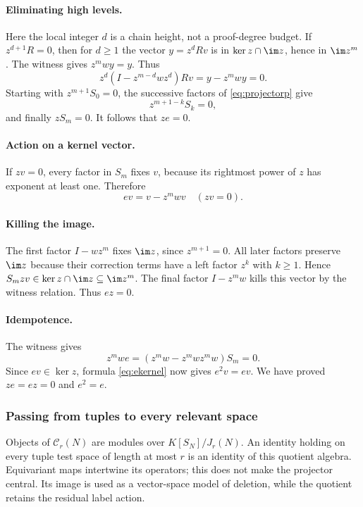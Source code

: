 \paragraph{Eliminating high levels.}
Here the local integer $d$ is a chain height, not a proof-degree budget.
If $z^{d+1}R=0$, then for $d\ge1$ the vector $y=z^dRv$ is in $\ker z\cap\im z$, hence in $\im z^m$. The witness gives $z^mwy=y$. Thus
\[z^d(I-z^{m-d}wz^d)Rv=y-z^mwy=0.
\]
Starting with $z^{m+1}S_0=0$, the successive factors of \eqref{eq:projectorp} give
\[z^{m+1-k}S_k=0,
\]
and finally $zS_m=0$. It follows that $ze=0$.

\paragraph{Action on a kernel vector.}
If $zv=0$, every factor in $S_m$ fixes $v$, because its rightmost power of $z$ has exponent at least one. Therefore
\begin{equation}\label{eq:ekernel}ev=v-z^mwv\quad(zv=0).
\end{equation}

\paragraph{Killing the image.}
The first factor $I-wz^m$ fixes $\im z$, since $z^{m+1}=0$. All later factors preserve $\im z$ because their correction terms have a left factor $z^k$ with $k\ge1$. Hence $S_mzv\in\ker z\cap\im z\subseteq\im z^m$. The final factor $I-z^mw$ kills this vector by the witness relation. Thus $ez=0$.

\paragraph{Idempotence.}
The witness gives
\[z^mwe=(z^mw-z^mwz^mw)S_m=0.
\]
Since $ev\in\ker z$, formula \eqref{eq:ekernel} now gives $e^2v=ev$. We have proved $ze=ez=0$ and $e^2=e$.

\subsubsection{Passing from tuples to every relevant space}
Objects of $\mathcal C_r(N)$ are modules over $K[S_N]/J_r(N)$.
An identity holding on every tuple test space of length at most $r$ is an identity
of this quotient algebra. Equivariant maps intertwine its operators;
this does not make the projector central. Its image is used as a
vector-space model of deletion, while the quotient retains the residual
label action.


